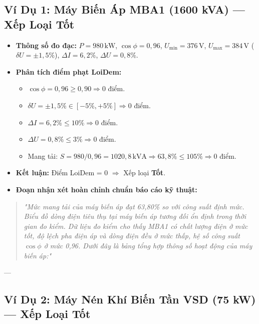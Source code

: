 \documentclass[12pt,a4paper]{article}
\begin{document}
\subsection{Ví Dụ 1: Máy Biến Áp MBA1 (1600 kVA) --- Xếp Loại Tốt}

\begin{itemize}
  \item \textbf{Thông số đo đạc:} $P = 980\,\mathrm{kW}$, $\cos\phi = 0{,}96$, $U_{\min} = 376\,\mathrm{V}$, $U_{\max} = 384\,\mathrm{V}$ ($\delta U = \pm 1{,}5\%$), $\Delta I = 6{,}2\%$, $\Delta U = 0{,}8\%$.
  \item \textbf{Phân tích điểm phạt LoiDem:}
  \begin{itemize}
    \item $\cos\phi = 0{,}96 \ge 0{,}90 \Rightarrow 0$ điểm.
    \item $\delta U = \pm 1{,}5\% \in [-5\%, +5\%] \Rightarrow 0$ điểm.
    \item $\Delta I = 6{,}2\% \le 10\% \Rightarrow 0$ điểm.
    \item $\Delta U = 0{,}8\% \le 3\% \Rightarrow 0$ điểm.
    \item Mang tải: $S = 980 / 0{,}96 = 1020{,}8\,\mathrm{kVA} \Rightarrow 63{,}8\% \le 105\% \Rightarrow 0$ điểm.
  \end{itemize}
  \item \textbf{Kết luận:} Điểm LoiDem = 0 $\Rightarrow$ Xếp loại \textbf{\color{darkgreen}Tốt}.
  \item \textbf{Đoạn nhận xét hoàn chỉnh chuẩn báo cáo kỹ thuật:}
\end{itemize}

\begin{quote}\itshape
"Mức mang tải của máy biến áp đạt 63,80\% so với công suất định mức. Biểu đồ dòng điện tiêu thụ tại máy biến áp tương đối ổn định trong thời gian đo kiểm. Dữ liệu đo kiểm cho thấy MBA1 có chất lượng điện ở mức tốt, độ lệch pha điện áp và dòng điện đều ở mức thấp, hệ số công suất $\cos\phi$ ở mức 0,96. Dưới đây là bảng tổng hợp thông số hoạt động của máy biến áp:"
\end{quote}

---

\subsection{Ví Dụ 2: Máy Nén Khí Biến Tần VSD (75 kW) --- Xếp Loại Tốt}
\end{document}

